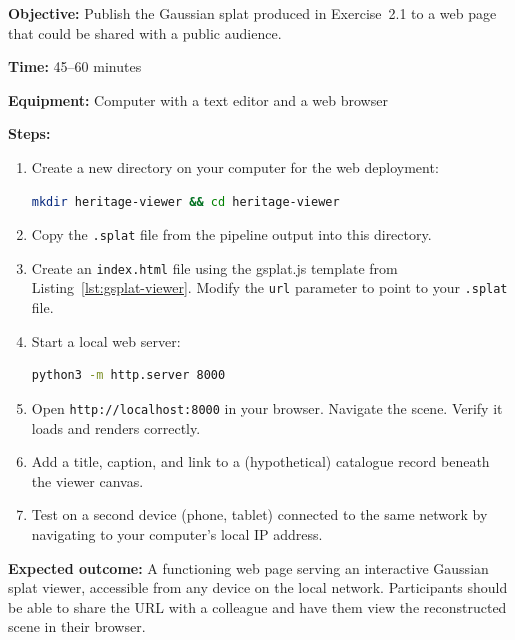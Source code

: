 \begin{tcolorbox}[
  enhanced,
  colback=SuccessGreen!8,
  colframe=SuccessGreen,
  fonttitle=\bfseries\sffamily,
  title={Exercise 3.1: Web Publication},
  sharp corners=south,
  boxrule=0.6pt
]
\textbf{Objective:} Publish the Gaussian splat produced in Exercise~2.1 to a web page that could be shared with a public audience.

\textbf{Time:} 45--60 minutes

\textbf{Equipment:} Computer with a text editor and a web browser

\textbf{Steps:}
\begin{enumerate}
  \item Create a new directory on your computer for the web deployment:
    \begin{lstlisting}[language=bash, numbers=none]
mkdir heritage-viewer && cd heritage-viewer
    \end{lstlisting}
  \item Copy the \texttt{.splat} file from the pipeline output into this directory.
  \item Create an \texttt{index.html} file using the gsplat.js template from Listing~\ref{lst:gsplat-viewer}. Modify the \texttt{url} parameter to point to your \texttt{.splat} file.
  \item Start a local web server:
    \begin{lstlisting}[language=bash, numbers=none]
python3 -m http.server 8000
    \end{lstlisting}
  \item Open \texttt{http://localhost:8000} in your browser. Navigate the scene. Verify it loads and renders correctly.
  \item Add a title, caption, and link to a (hypothetical) catalogue record beneath the viewer canvas.
  \item Test on a second device (phone, tablet) connected to the same network by navigating to your computer's local IP address.
\end{enumerate}

\textbf{Expected outcome:} A functioning web page serving an interactive Gaussian splat viewer, accessible from any device on the local network. Participants should be able to share the URL with a colleague and have them view the reconstructed scene in their browser.
\end{tcolorbox}

